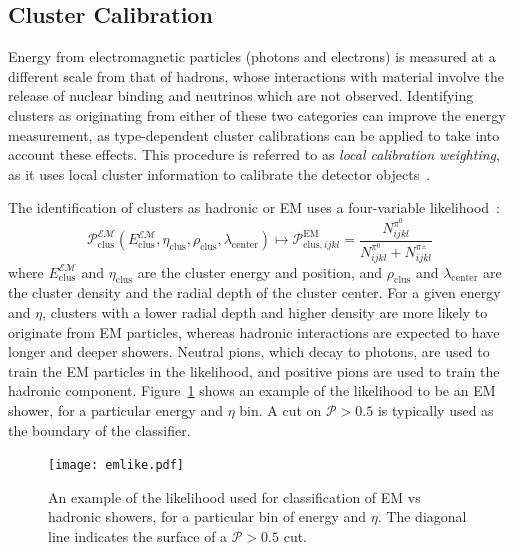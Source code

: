 
\subsection{Cluster Calibration}

Energy from electromagnetic particles (photons and electrons) is measured at a different scale from that of hadrons, whose interactions with material involve the release of nuclear binding and neutrinos which are not observed. Identifying clusters as originating from either of these two categories can improve the energy measurement, as type-dependent cluster calibrations can be applied to take into account these effects. This procedure is referred to as \textit{local calibration weighting}, as it uses local cluster information to calibrate the detector objects~\cite{Loch:1967028}.

The identification of clusters as hadronic or EM uses a four-variable likelihood~\cite{Loch:1967028}:
%
\begin{equation}
\mathcal{P}_\mathrm{clus}^\mathcal{EM}(E_\mathrm{clus}^\mathcal{EM}, \eta_\mathrm{clus}, \rho_\mathrm{clus},\lambda_\mathrm{center} ) \mapsto \mathcal{P}^\mathrm{EM}_{\mathrm{clus},ijkl} = \frac{N_{ijkl}^{\pi^0}}{N_{ijkl}^{\pi^0} + N_{ijkl}^{\pi^\pm}}
\end{equation}
%
where $E_\mathrm{clus}^\mathcal{EM}$ and $\eta_\mathrm{clus}$ are the cluster energy and position, and $\rho_\mathrm{clus}$ and $\lambda_\mathrm{center}$ are the cluster density and the radial depth of the cluster center. For a given energy and $\eta$, clusters with a lower radial depth and higher density are more likely to originate from EM particles, whereas hadronic interactions are expected to have longer and deeper showers. Neutral pions, which decay to photons, are used to train the EM particles in the likelihood, and positive pions are used to train the hadronic component. Figure~\ref{fig:jet-reconstruction:cluster-calibration:em-like} shows an example of the likelihood to be an EM shower, for a particular energy and $\eta$ bin. A cut on $\mathcal{P} > 0.5$ is typically used as the boundary of the classifier.


\begin{figure}
\centering
\texttt{[image: emlike.pdf]}
\caption{An example of the likelihood used for classification of EM vs hadronic showers, for a particular bin of energy and $\eta$. The diagonal line indicates the surface of a $\mathcal{P} > 0.5$ cut.}
\label{fig:jet-reconstruction:cluster-calibration:em-like}
\end{figure}

